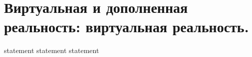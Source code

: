 \chapter{Виртуальная и дополненная реальность: виртуальная реальность.}

{statement}
{statement}
{statement}